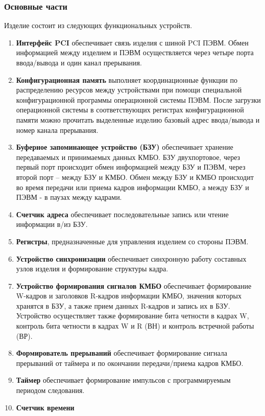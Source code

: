 	\subsubsection{Основные части}
	Изделие состоит из следующих функциональных устройств.
	\begin{enumerate}
		\item \textbf{Интерфейс PCI} обеспечивает связь изделия с шиной PCI ПЭВМ. Обмен информацией между изделием и ПЭВМ осуществляется через четыре порта ввода/вывода и один канал прерывания.
		\item \textbf{Конфигурационная память} выполняет координационные функции по распределению ресурсов между устройствами при помощи специальной конфигурационной программы операционной системы ПЭВМ. После загрузки операционной системы в соответствующих регистрах конфигурационной памяти можно прочитать выделенные изделию базовый адрес ввода/вывода и номер канала прерывания.
		\item \textbf{Буферное запоминающее устройство (БЗУ)} обеспечивает хранение передаваемых и принимаемых данных КМБО. БЗУ двухпортовое, через первый порт происходит обмен информацией между БЗУ и ПЭВМ, через второй порт – между БЗУ и КМБО. Обмен между БЗУ и КМБО происходит во время передачи или приема кадров информации КМБО, а между БЗУ и ПЭВМ - в паузах между кадрами.
		\item\textbf{ Счетчик адреса} обеспечивает последовательные запись или чтение информации в/из БЗУ. 
		\item \textbf{Регистры}, предназначенные для управления изделием со стороны ПЭВМ.
		\item \textbf{Устройство синхронизации} обеспечивает синхронную работу составных узлов изделия и формирование структуры кадра.
		\item \textbf{Устройство формирования сигналов КМБО} обеспечивает формирование 
		W-кадров и заголовков R-кадров информации КМБО, значения которых хранятся в БЗУ, а также прием данных R-кадров и запись их в БЗУ. Устройство осуществляет также формирование бита четности в кадрах W, контроль бита четности в кадрах W и R (ВН) и контроль встречной работы (ВР).
		\item \textbf{Формирователь прерываний} обеспечивает формирование сигнала прерываний от таймера и по окончании передачи/приема кадров КМБО. 
		\item \textbf{Таймер} обеспечивает формирование импульсов с программируемым периодом следования. 
		\item \textbf{Счетчик времени}
	\end{enumerate}

